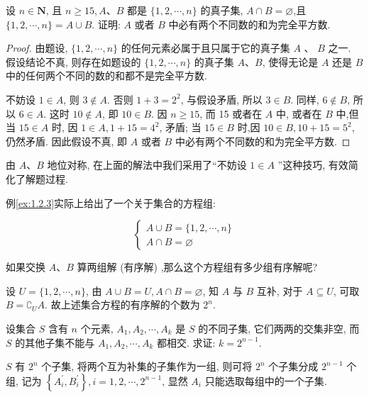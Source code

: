 \begin{example}\label{ex:1.2.3}
	设 $n \in \mathbf{N}$, 且 $n \geqslant 15, A 、 B$ 都是 $\{1,2, \cdots, n\}$ 的真子集, $A \cap B=\varnothing$,且 $\{1,2, \cdots, n\}=A \cup B$. 证明: $A$ 或者 $B$ 中必有两个不同数的和为完全平方数.
\end{example}

\begin{proof}
	由题设, $\{1,2, \cdots, n\}$ 的任何元素必属于且只属于它的真子集 $A$ 、 $B$ 之一. 假设结论不真, 则存在如题设的 $\{1,2, \cdots, n\}$ 的真子集 $A 、 B$, 使得无论是 $A$ 还是 $B$ 中的任何两个不同的数的和都不是完全平方数.

	不妨设 $1 \in A$, 则 $3 \notin A$. 否则 $1+3=2^{2}$, 与假设矛盾, 所以 $3 \in B$. 同样, $6 \notin B$, 所以 $6 \in A$. 这时 $10 \notin A$, 即 $10 \in B$. 因 $n \geqslant 15$, 而 15 或者在 $A$ 中, 或者在 $B$ 中,但当 $15 \in A$ 时, 因 $1 \in A, 1+15=4^{2}$, 矛盾; 当 $15 \in B$ 时,因 $10 \in B, 10+15=5^{2}$, 仍然矛盾. 因此假设不真, 即 $A$ 或者 $B$ 中必有两个不同数的和为完全平方数.
\end{proof}

\begin{note}
	由 $A 、 B$ 地位对称, 在上面的解法中我们采用了“不妨设 $1 \in A$ ”这种技巧, 有效简化了解题过程.
\end{note}

例\ref{ex:1.2.3}实际上给出了一个关于集合的方程组:

$$
	\left\{\begin{array}{l}
		A \cup B=\{1,2, \cdots, n\} \\
		A \cap B=\varnothing
	\end{array}\right.
$$

如果交换 $A 、 B$ 算两组解 (有序解) ,那么这个方程组有多少组有序解呢?

设 $U=\{1,2, \cdots, n\}$, 由 $A \cup B=U, A \cap B=\varnothing$, 知 $A$ 与 $B$ 互补, 对于 $A \subseteq U$, 可取 $B=\complement_{U} A$. 故上述集合方程的有序解的个数为 $2^{n}$.

\begin{example}
	设集合 $S$ 含有 $n$ 个元素, $A_{1}, A_{2}, \cdots, A_{k}$ 是 $S$ 的不同子集, 它们两两的交集非空, 而 $S$ 的其他子集不能与 $A_{1}, A_{2}, \cdots, A_{k}$ 都相交. 求证: $k=2^{n-1}$.
\end{example}

\begin{analysis}
	$S$ 有 $2^{n}$ 个子集, 将两个互为补集的子集作为一组, 则可将 $2^{n}$ 个子集分成 $2^{n-1}$ 个组, 记为 $\left\{A_{i}^{\prime}, B_{i}^{\prime}\right\}, i=1,2, \cdots, 2^{n-1}$, 显然 $A_{i}$ 只能选取每组中的一个子集.
\end{analysis}

